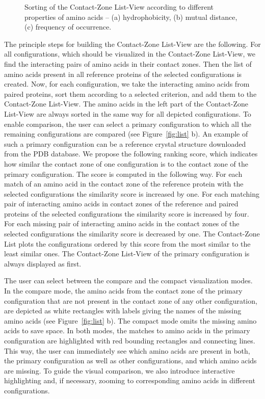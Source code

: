 \documentclass[twocolumn]{bmcart}%
\def\CoZoListView {Contact-Zone List-View\xspace}
\def\CoZoList{Contact-Zone List\xspace}
\begin{document}
\begin{figure}[tb]
    \vspace{-5pt}
    \caption{Sorting of the \CoZoListView according to different properties of amino acids -- (a) hydrophobicity, (b) mutual distance, (c) frequency of occurrence.}
  \label{fig:sorting}
\end{figure}


The principle steps for building the \CoZoListView are the following.
For all configurations, which should be visualized in the \CoZoListView, we find the interacting pairs of amino acids in their contact zones.
Then the list of amino acids present in all reference proteins of the selected configurations is created.
Now, for each configuration, we take the interacting amino acids from paired proteins, sort them according to a selected criterion, and add them to the \CoZoListView.
The amino acids in the left part of the \CoZoListView are always sorted in the same way for all depicted configurations.
To enable comparison, the user can select a primary configuration to which all the remaining configurations are compared (see Figure~\ref{fig:list} b).
An example of such a primary configuration can be a reference crystal structure downloaded from the PDB database.
We propose the following ranking score, which indicates how similar the contact zone of one configuration is to the contact zone of the primary configuration.
The score is computed in the following way.
For each match of an amino acid in the contact zone of the reference protein with the selected configurations the similarity score is increased by one.
For each matching pair of interacting amino acids in contact zones of the reference and paired proteins of the selected configurations the similarity score is increased by four.
For each missing pair of interacting amino acids in the contact zones of the selected configurations the similarity score is decreased by one.
The \CoZoList plots the configurations ordered by this score from the most similar to the least similar ones.
The \CoZoListView of the primary configuration is always displayed as first.

The user can select between the compare and the compact visualization modes.
In the compare mode, the amino acids from the contact zone of the primary configuration that are not present in the contact zone of any other configuration, are depicted as white rectangles with labels giving the names of the missing amino acids (see Figure~\ref{fig:list} b).
The compact mode omits the missing amino acids to save space.
In both modes, the matches to amino acids in the primary configuration are highlighted with red bounding rectangles and connecting lines.
This way, the user can immediately see which amino acids are present in both, the primary configuration as well as other configurations, and which amino acids are missing.
To guide the visual comparison, we also introduce interactive highlighting and, if necessary, zooming to corresponding amino acids in different configurations.
\end{document}
